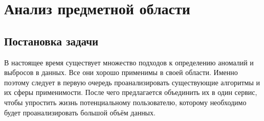 \chapter{Анализ предметной области} \label{ch:ch1}

\section{Постановка задачи} \label{sec:ch1/sec1}

В настоящее время существует множество подходов к определению аномалий и выбросов в данных. Все они хорошо применимы в своей области. Именно поэтому следует в первую очередь проанализировать существующие алгоритмы и их сферы применимости. После чего предлагается объединить их в один сервис, чтобы упростить жизнь потенциальному пользователю, которому необходимо будет проанализировать большой объём данных. \cite{guvenir}
